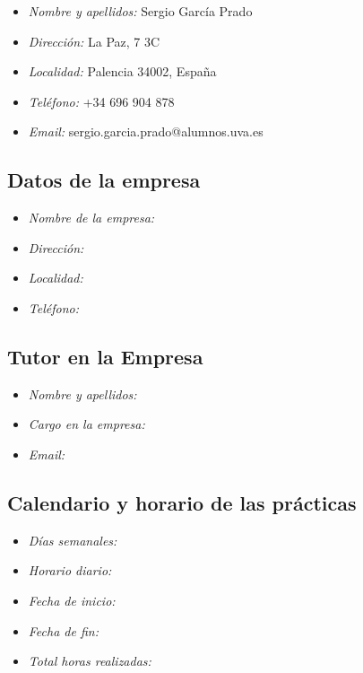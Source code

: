 \documentclass[a4paper,spanish]{article}
\begin{document}
      \begin{itemize}
        \item \emph{Nombre y apellidos:} Sergio García Prado
        \item \emph{Dirección:} La Paz, 7 3C
        \item \emph{Localidad:} Palencia 34002, España
        \item \emph{Teléfono:} +34 696 904 878
        \item \emph{Email:} sergio.garcia.prado@alumnos.uva.es
      \end{itemize}


    \subsection{Datos de la empresa}

      \begin{itemize}
        \item \emph{Nombre de la empresa:}
        \item \emph{Dirección:}
        \item \emph{Localidad:}
        \item \emph{Teléfono:}
      \end{itemize}


    \subsection{Tutor en la Empresa}

      \begin{itemize}
        \item \emph{Nombre y apellidos:}
        \item \emph{Cargo en la empresa:}
        \item \emph{Email:}
      \end{itemize}


    \subsection{Calendario y horario de las prácticas}

      \begin{itemize}
        \item \emph{Días semanales:}
        \item \emph{Horario diario:}
        \item \emph{Fecha de inicio:}
        \item \emph{Fecha de fin:}
        \item \emph{Total horas realizadas:}
      \end{itemize}
\end{document}
